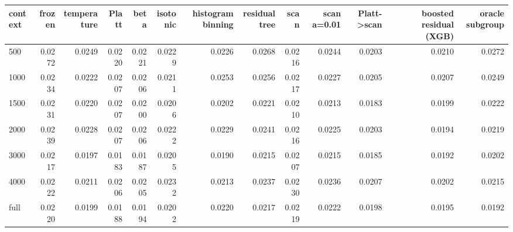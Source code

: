 \begin{tabular}{lrrrrrrrrrrrr}
\toprule
context & frozen & temperature & Platt & beta & isotonic & histogram binning & residual tree & scan & scan a=0.01 & Platt->scan & boosted residual (XGB) & oracle subgroup \\
\midrule
500 & 0.0272 & 0.0249 & 0.0220 & 0.0221 & 0.0229 & 0.0226 & 0.0268 & 0.0216 & 0.0244 & 0.0203 & 0.0210 & 0.0272 \\
1000 & 0.0234 & 0.0222 & 0.0207 & 0.0206 & 0.0211 & 0.0253 & 0.0256 & 0.0217 & 0.0227 & 0.0205 & 0.0207 & 0.0249 \\
1500 & 0.0231 & 0.0220 & 0.0207 & 0.0200 & 0.0206 & 0.0202 & 0.0221 & 0.0210 & 0.0213 & 0.0183 & 0.0199 & 0.0222 \\
2000 & 0.0239 & 0.0228 & 0.0207 & 0.0206 & 0.0222 & 0.0229 & 0.0241 & 0.0216 & 0.0225 & 0.0203 & 0.0194 & 0.0219 \\
3000 & 0.0217 & 0.0197 & 0.0183 & 0.0187 & 0.0205 & 0.0190 & 0.0215 & 0.0207 & 0.0215 & 0.0185 & 0.0192 & 0.0202 \\
4000 & 0.0222 & 0.0211 & 0.0206 & 0.0205 & 0.0232 & 0.0213 & 0.0237 & 0.0230 & 0.0236 & 0.0207 & 0.0202 & 0.0215 \\
full & 0.0220 & 0.0199 & 0.0188 & 0.0194 & 0.0202 & 0.0220 & 0.0217 & 0.0219 & 0.0222 & 0.0198 & 0.0195 & 0.0192 \\
\bottomrule
\end{tabular}
